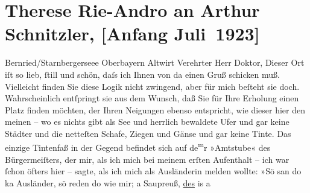 

         
         \renewcommand{\erwaehntePersonen}{Personen: Ludwig Thoma}
         \renewcommand{\erwaehnteOrte}{Orte: Bernried, Deutschland, Hotel Seeblick, München, Oberbayern, Wien}
         \renewcommand{\erwaehnteWerke}{}
               \section[Therese Rie-Andro an Arthur Schnitzler, {[}Anfang Juli 1923{]}]{ Therese Rie-Andro an Arthur Schnitzler, {[}Anfang Juli 1923{]}}\nopagebreak{}\rehead{ }\begin{ledgroupsized}[t]{13cm}\normalsize\beginnumbering \toendnotes[C]{\smallbreak\pagebreak[2]} 
\pstart
           \noindent{}\raggedleft{}{\pb}Bernried/Starnbergerseee\pend
           \pstart
           \noindent{}\raggedleft{}Oberbayern\pend
           \pstart
           \noindent{}\raggedleft{}Altwirt\pend
           \pstart{}Verehrter Herr Doktor,\pend\pstart
           Dieser Ort iſt so lieb, ſtill und schön, daſs ich Ihnen von da einen Gruß schicken
                    muß. Vielleicht finden Sie diese Logik nicht zwingend, aber für mich beſteht sie
                    doch. Wahrscheinlich entſpringt sie aus dem Wunsch, daß Sie für Ihre Erholung
                    einen Platz finden möchten, der Ihren Neigungen ebenso entspricht, wie dieser
                    hier den meinen – wo es nichts gibt als See und herrlich bewaldete Ufer und gar
                    keine Städter und die netteſten Schafe, Ziegen und Gänse und gar keine Tinte.
                        {\pb}Das einzige Tintenfaß in der Gegend befindet sich
                    auf de\substVorne{}\textsuperscript{m}\substDazwischen{}r\substHinten{} »Amtstube« des Bürgermeiſters, der mir, als ich mich bei meinem erſten
                    Aufenthalt – ich war ſchon öfters hier – sagte, als ich mich als Ausländerin
                    melden wollte: »Sö san do ka Ausländer, sö reden do wie mir; a Saupreuß, \uline{des} is a

\end{ledgroupsized}
